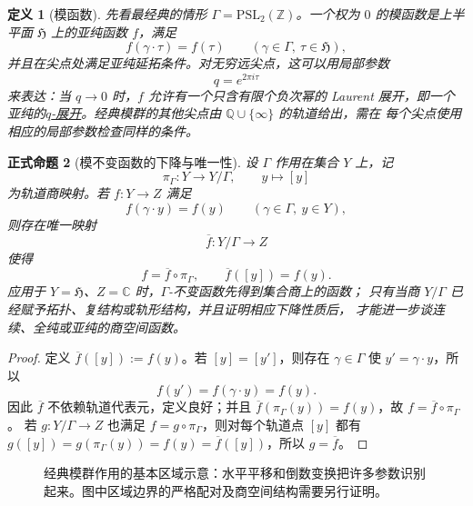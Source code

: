\documentclass[UTF8,fontset=none,a4paper,11pt]{ctexart}
\theoremstyle{foundation-definition}
\newtheorem{definition}{定义}[section]
\theoremstyle{foundation-theorem}
\theoremstyle{foundation-proposition}
\newtheorem{proposition}[definition]{正式命题}
\theoremstyle{foundation-example}
\theoremstyle{foundation-remark}
\theoremstyle{foundation-theorem}
\newcommand{\term}[2]{\hyperref[#1]{#2}}
\begin{document}
\begin{definition}[模函数]\label{def:modular-function}
先看最经典的情形 \(\Gamma=\mathrm{PSL}_2(\mathbb Z)\)。一个权为 \(0\) 的模函数是上半平面 \(\mathfrak H\) 上的亚纯函数 \(f\)，满足
\[
f(\gamma\cdot\tau)=f(\tau)\qquad(\gamma\in\Gamma,\ \tau\in\mathfrak H),
\]
并且在尖点处满足亚纯延拓条件。对无穷远尖点，这可以用局部参数
\[
q=e^{2\pi i\tau}
\]
来表达：当 \(q\to0\) 时，\(f\) 允许有一个只含有限个负次幂的 Laurent
展开，即一个亚纯的\term{def:q-expansion}{\(q\)-展开}。经典模群的其他尖点由 \(\mathbb Q\cup\{\infty\}\) 的轨道给出，需在
每个尖点使用相应的局部参数检查同样的条件。
\end{definition}

\begin{proposition}[模不变函数的下降与唯一性]\label{prop:modular-invariant-descent}
设 \(\Gamma\) 作用在集合 \(Y\) 上，记
\[
\pi_\Gamma:Y\longrightarrow Y/\Gamma,\qquad
y\longmapsto [y]
\]
为轨道商映射。若 \(f:Y\to Z\) 满足
\[
f(\gamma\cdot y)=f(y)\qquad(\gamma\in\Gamma,\ y\in Y),
\]
则存在唯一映射
\[
\overline f:Y/\Gamma\longrightarrow Z
\]
使得
\[
f=\overline f\circ\pi_\Gamma,\qquad
\overline f([y])=f(y).
\]
应用于 \(Y=\mathfrak H\)、\(Z=\mathbb C\) 时，\(\Gamma\)-不变函数先得到集合商上的函数；
只有当商 \(Y/\Gamma\) 已经赋予拓扑、复结构或轨形结构，并且证明相应下降性质后，
才能进一步谈连续、全纯或亚纯的商空间函数。
\end{proposition}

\begin{proof}
定义 \(\overline f([y]):=f(y)\)。若 \([y]=[y']\)，则存在 \(\gamma\in\Gamma\) 使
\(y'=\gamma\cdot y\)，所以
\[
f(y')=f(\gamma\cdot y)=f(y).
\]
因此 \(\overline f\) 不依赖轨道代表元，定义良好；并且
\(\overline f(\pi_\Gamma(y))=f(y)\)，故 \(f=\overline f\circ\pi_\Gamma\)。
若 \(g:Y/\Gamma\to Z\) 也满足 \(f=g\circ\pi_\Gamma\)，则对每个轨道点
\([y]\) 都有 \(g([y])=g(\pi_\Gamma(y))=f(y)=\overline f([y])\)，所以 \(g=\overline f\)。
\end{proof}

\begin{figure}[htbp]
\centering
{}
\caption{经典模群作用的基本区域示意：水平平移和倒数变换把许多参数识别起来。图中区域边界的严格配对及商空间结构需要另行证明。}
\label{fig:modular-fundamental-domain}
\end{figure}
\end{document}
